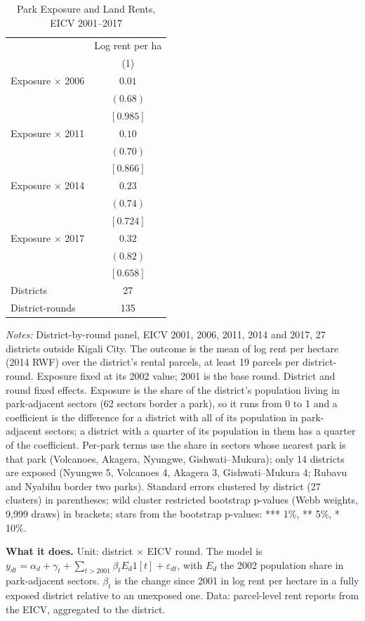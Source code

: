 \documentclass[11pt]{article}
\begin{document}
\begin{table}[H]
\centering\small\setlength{\tabcolsep}{4pt}
\caption{Park Exposure and Land Rents, EICV 2001--2017}
\label{tab:land_rounds}
\begin{tabular}{lc}
\toprule
 & Log rent per ha \\
 & (1) \\
\midrule
Exposure $\times$ 2006 & $0.01$ \\
 & $(0.68)$ \\
 & $[0.985]$ \\
Exposure $\times$ 2011 & $0.10$ \\
 & $(0.70)$ \\
 & $[0.866]$ \\
Exposure $\times$ 2014 & $0.23$ \\
 & $(0.74)$ \\
 & $[0.724]$ \\
Exposure $\times$ 2017 & $0.32$ \\
 & $(0.82)$ \\
 & $[0.658]$ \\
\midrule
Districts & 27 \\
District-rounds & 135 \\
\bottomrule
\end{tabular}
\begin{minipage}{0.95\textwidth}\footnotesize
\textit{Notes:} District-by-round panel, EICV 2001, 2006, 2011, 2014 and 2017, 27 districts outside Kigali City. The outcome is the mean of log rent per hectare (2014 RWF) over the district's rental parcels, at least 19 parcels per district-round. Exposure fixed at its 2002 value; 2001 is the base round. District and round fixed effects. Exposure is the share of the district's population living in park-adjacent sectors (62 sectors border a park), so it runs from 0 to 1 and a coefficient is the difference for a district with all of its population in park-adjacent sectors; a district with a quarter of its population in them has a quarter of the coefficient. Per-park terms use the share in sectors whose nearest park is that park (Volcanoes, Akagera, Nyungwe, Gishwati--Mukura); only 14 districts are exposed (Nyungwe 5, Volcanoes 4, Akagera 3, Gishwati--Mukura 4; Rubavu and Nyabihu border two parks). Standard errors clustered by district (27 clusters) in parentheses; wild cluster restricted bootstrap p-values (Webb weights, 9,999 draws) in brackets; stars from the bootstrap p-values: *** 1\%, ** 5\%, * 10\%.
\end{minipage}
\end{table}
\textbf{What it does.} Unit: district $\times$ EICV round. The model is $y_{dt} = \alpha_d + \gamma_t + \sum_{t>2001}\beta_t E_d 1[t] + \varepsilon_{dt}$, with $E_d$ the 2002 population share in park-adjacent sectors. $\beta_t$ is the change since 2001 in log rent per hectare in a fully exposed district relative to an unexposed one. Data: parcel-level rent reports from the EICV, aggregated to the district.
\end{document}
